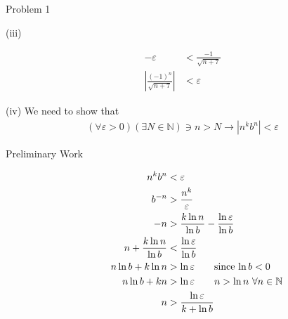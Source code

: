 \documentclass[10pt]{extarticle}
\newcommand{\N}{\mathbb{N}}
\begin{document}
\begin{problem}{Problem 1}
\begin{problem}{(iii)}
\begin{description}
\begin{align*}
            -\varepsilon &< \frac{-1}{\sqrt{n+7}}\\
            \left|\frac{(-1)^{n}}{\sqrt{n+7}}\right| & < \varepsilon
          \end{align*}
      \end{description}
    \end{problem}
    \begin{problem}{(iv)}
      We need to show that
      \begin{align*}
        (\forall \varepsilon > 0)(\exists N\in\N) \ni n > N \rightarrow \left|n^kb^n\right| < \varepsilon
      \end{align*}
      \begin{description}
        \item[Preliminary Work]
          \begin{align*}
            n^kb^n &< \varepsilon\\
            b^{-n} &> \frac{n^k}{\varepsilon}\\
            -n &> \frac{k\ln n}{\ln b} - \frac{\ln \varepsilon}{\ln b}\\
            n + \frac{k\ln n}{\ln b} & < \frac{\ln \varepsilon}{\ln b} \\
            n\ln b + k\ln n &> \ln \varepsilon \tag*{since $\ln b < 0$}\\
            n \ln b + kn &> \ln \varepsilon \tag*{$n > \ln n~ \forall n\in \N$}\\
            n &> \frac{\ln \varepsilon}{k + \ln b}
          \end{align*}
      \end{description}
    \end{problem}
  \end{problem}
\end{document}

